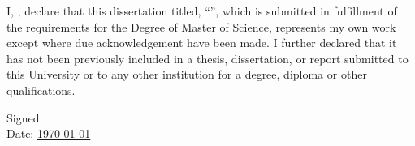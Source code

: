 \begin{declaration}
\setcounter{page}{1}
\addchaptertocentry{\authorshipname} %

\vspace{0.6cm}
I, \authorname, declare that this dissertation titled, \enquote{\ttitle}, which is submitted in fulfillment of the requirements for the Degree of Master of Science, represents my own work except where due acknowledgement have been made. I further declared that it has not been previously included in a thesis, dissertation, or report submitted to this University or to any other institution for a degree, diploma or other qualifications.


\vspace{2cm} 
\begin{flushright}
\hfill Signed: \underline{\hspace{5cm}}\\[2em] %
\hfill Date: \underline{\hspace{1.5cm} \usdate\today \hspace{1.5cm}}\\ %
\end{flushright}

\end{declaration}


